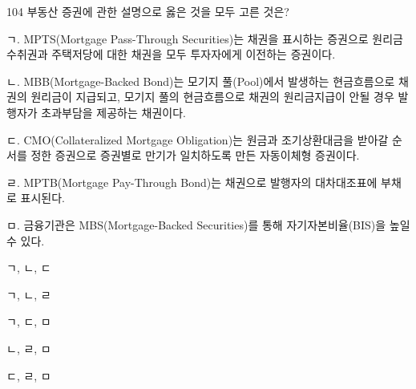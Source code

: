 \begin{question}{104}
부동산 증권에 관한 설명으로 옳은 것을 모두 고른 것은?
\begin{framedtext}
ㄱ. MPTS(Mortgage Pass-Through Securities)는 채권을 표시하는 증권으로 원리금수취권과 주택저당에 대한 채권을 모두 투자자에게 이전하는 증권이다. \par
ㄴ. MBB(Mortgage-Backed Bond)는 모기지 풀(Pool)에서 발생하는 현금흐름으로 채권의 원리금이 지급되고, 모기지 풀의 현금흐름으로 채권의 원리금지급이 안될 경우 발행자가 초과부담을 제공하는 채권이다. \par
ㄷ. CMO(Collateralized Mortgage Obligation)는 원금과 조기상환대금을 받아갈 순서를 정한 증권으로 증권별로 만기가 일치하도록 만든 자동이체형 증권이다. \par
ㄹ. MPTB(Mortgage Pay-Through Bond)는 채권으로 발행자의 대차대조표에 부채로 표시된다. \par
ㅁ. 금융기관은 MBS(Mortgage-Backed Securities)를 통해 자기자본비율(BIS)을 높일 수 있다. \par
\end{framedtext}
\begin{choices}
  \item ㄱ, ㄴ, ㄷ
  \item ㄱ, ㄴ, ㄹ
  \item ㄱ, ㄷ, ㅁ
  \item ㄴ, ㄹ, ㅁ
  \item ㄷ, ㄹ, ㅁ
\end{choices}
\end{question}
